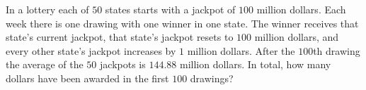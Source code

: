 In a lottery each of $50$ states starts with a jackpot of $100$ million dollars. Each week there is one drawing with one winner in one state. The winner receives that state's current jackpot, that state's jackpot resets to $100$ million dollars, and every other state's jackpot increases by $1$ million dollars. After the $100$th drawing the average of the $50$ jackpots is $144.88$ million dollars. In total, how many dollars have been awarded in the first $100$ drawings?
